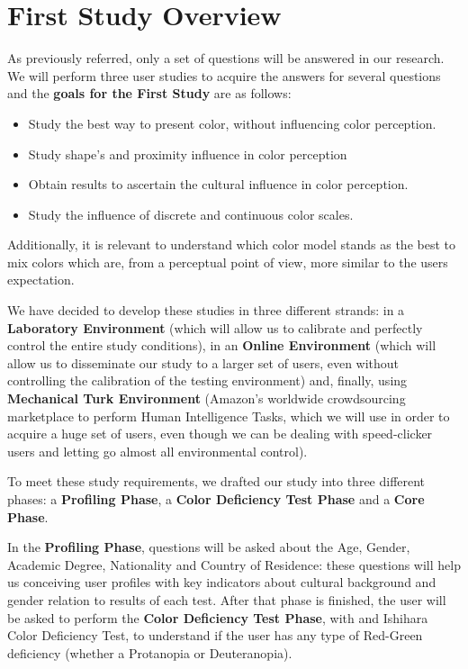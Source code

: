 \documentclass{report}
\begin{document}
\section{First Study Overview}
%
As previously referred, only a set of questions will be answered in our research. We will perform three user studies to acquire the answers for several questions and the \textbf{goals for the First Study} are as follows:
\begin{itemize}
	\item Study the best way to present color, without influencing color perception. 
    \item Study shape's and proximity influence in color perception
    \item Obtain results to ascertain the cultural influence in color perception.
    \item Study the influence of discrete and continuous color scales.
\end{itemize}
%
Additionally, it is relevant to understand which color model stands as the best to mix colors which are, from a perceptual point of view, more similar to the users expectation. \par
We have decided to develop these studies in three different strands: in a \textbf{Laboratory Environment} (which will allow us to calibrate and perfectly control the entire study conditions), in an \textbf{Online Environment} (which will allow us to disseminate our study to a larger set of users, even without controlling the calibration of the testing environment) and, finally, using \textbf{Mechanical Turk Environment} (Amazon's worldwide crowdsourcing marketplace to perform Human Intelligence Tasks, which we will use in order to acquire a huge set of users, even though we can be dealing with speed-clicker users and letting go almost all environmental control). \par 
To meet these study requirements, we drafted our study into three different phases: a \textbf{Profiling Phase}, a \textbf{Color Deficiency Test Phase} and a \textbf{Core Phase}. \par 
In the \textbf{Profiling Phase}, questions will be asked about the Age, Gender, Academic Degree, Nationality and Country of Residence: these questions will help us
conceiving user profiles with key indicators about cultural background and gender relation to results of each test. After that phase is finished, the user will be asked to perform the \textbf{Color Deficiency Test Phase}, with and Ishihara Color Deficiency Test, to understand if the user has any type of Red-Green deficiency
(whether a Protanopia or Deuteranopia). \par
%
\end{document}

